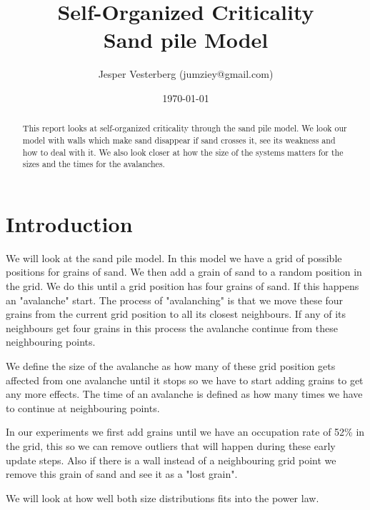 \documentclass[11pt]{article}
\title{Self-Organized Criticality \\ Sand pile Model}
\author{Jesper Vesterberg (jumziey@gmail.com)}
\date{\today}
\begin{document}
\begin{titlepage}
  \maketitle
  \thispagestyle{fancy}
  \rhead{\today}
  \begin{abstract}
		This report looks at self-organized criticality through the sand pile model. We look our model with walls which make sand disappear if sand crosses it, see its weakness and how to deal with it. We also look closer at how the size of the systems matters for the sizes and the times for the avalanches.
  \end{abstract}
\end{titlepage}

\lhead{\theauthor}
\rhead{\thetitle\\\today}
\cfoot{\thepage}

\section{Introduction}
We will look at the sand pile model. In this model we have a grid of possible positions for grains of sand. We then add a grain of sand to a random position in the grid. We do this until a grid position has four grains of sand. If this happens an "avalanche" start. The process of "avalanching" is that we move these four grains from the current grid position to all its closest neighbours. If any of its neighbours get four grains in this process the avalanche continue from these neighbouring points. 

We define the size of the avalanche as how many of these grid position gets affected from one avalanche until it stops so we have to start adding grains to get any more effects. The time of an avalanche is defined as how many times we have to continue at neighbouring points. 

In our experiments we first add grains until we have an occupation rate of 52\% in the grid, this so we can remove outliers that will happen during these early update steps. Also if there is a wall instead of a neighbouring grid point we remove this grain of sand and see it as  a "lost grain". 

We will look at how well both size distributions fits into the power law.
\end{document}
